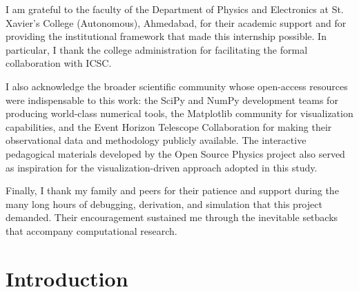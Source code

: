 \documentclass[12pt,a4paper]{article}
\begin{document}
I am grateful to the faculty of the Department of Physics and Electronics at St. Xavier’s College (Autonomous), Ahmedabad, for their academic support and for providing the institutional framework that made this internship possible. In particular, I thank the college administration for facilitating the formal collaboration with ICSC.

I also acknowledge the broader scientific community whose open-access resources were indispensable to this work: the SciPy and NumPy development teams for producing world-class numerical tools, the Matplotlib community for visualization capabilities, and the Event Horizon Telescope Collaboration for making their observational data and methodology publicly available. The interactive pedagogical materials developed by the Open Source Physics project also served as inspiration for the visualization-driven approach adopted in this study.

Finally, I thank my family and peers for their patience and support during the many long hours of debugging, derivation, and simulation that this project demanded. Their encouragement sustained me through the inevitable setbacks that accompany computational research.

\newpage

\pagestyle{plain}
\tableofcontents
\clearpage

\setcounter{page}{1}   %

\section{Introduction}
\end{document}
